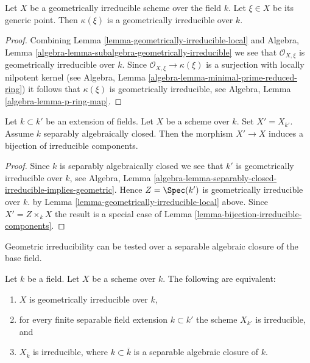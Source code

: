 \begin{lemma}
\label{lemma-geometrically-irreducible-function-field}
Let $X$ be a geometrically irreducible scheme over the field $k$.
Let $\xi \in X$ be its generic point. Then $\kappa(\xi)$ is a
geometrically irreducible over $k$.
\end{lemma}

\begin{proof}
Combining
Lemma \ref{lemma-geometrically-irreducible-local}
and
Algebra, Lemma \ref{algebra-lemma-subalgebra-geometrically-irreducible}
we see that $\mathcal{O}_{X, \xi}$ is geometrically irreducible over $k$.
Since $\mathcal{O}_{X, \xi} \to \kappa(\xi)$ is a surjection with
locally nilpotent kernel (see
Algebra, Lemma \ref{algebra-lemma-minimal-prime-reduced-ring})
it follows that $\kappa(\xi)$ is geometrically irreducible, see
Algebra, Lemma \ref{algebra-lemma-p-ring-map}.
\end{proof}

\begin{lemma}
\label{lemma-separably-closed-field-irreducible-components}
Let $k \subset k'$ be an extension of fields.
Let $X$ be a scheme over $k$. Set $X' = X_{k'}$.
Assume $k$ separably algebraically closed.
Then the morphism $X' \to X$ induces a bijection of irreducible components.
\end{lemma}

\begin{proof}
Since $k$ is separably algebraically closed we see that
$k'$ is geometrically irreducible over $k$, see Algebra,
Lemma \ref{algebra-lemma-separably-closed-irreducible-implies-geometric}.
Hence $Z = \Spec(k')$ is geometrically irreducible over $k$.
by Lemma \ref{lemma-geometrically-irreducible-local} above.
Since $X' = Z \times_k X$ the result is a special case
of Lemma \ref{lemma-bijection-irreducible-components}.
\end{proof}

\begin{lemma}
\label{lemma-characterize-geometrically-irreducible}
\begin{slogan}
Geometric irreducibility can be tested over a separable algebraic
closure of the base field.
\end{slogan}
Let $k$ be a field. Let $X$ be a scheme over $k$.
The following are equivalent:
\begin{enumerate}
\item $X$ is geometrically irreducible over $k$,
\item for every finite separable field extension $k \subset k'$
the scheme $X_{k'}$ is irreducible, and
\item $X_{\overline{k}}$ is irreducible, where $k \subset \overline{k}$
is a separable algebraic closure of $k$.
\end{enumerate}
\end{lemma}

